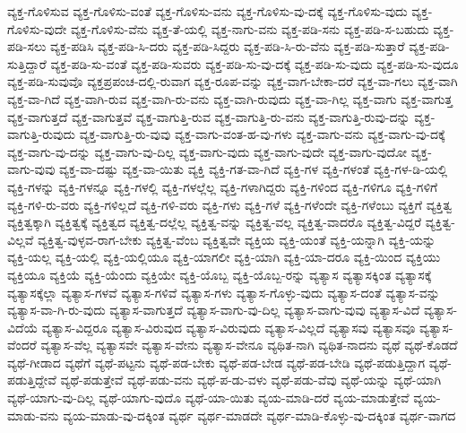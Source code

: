 {ವ್ಯಕ್ತ-ಗೊಳಿಸುವ
ವ್ಯಕ್ತ-ಗೊಳಿಸು-ವಂತೆ
ವ್ಯಕ್ತ-ಗೊಳಿಸು-ವನು
ವ್ಯಕ್ತ-ಗೊಳಿಸು-ವು-ದಕ್ಕೆ
ವ್ಯಕ್ತ-ಗೊಳಿಸು-ವುದು
ವ್ಯಕ್ತ-ಗೊಳಿಸು-ವುದೇ
ವ್ಯಕ್ತ-ಗೊಳಿಸು-ವೆನು
ವ್ಯಕ್ತ-ತೆ-ಯಲ್ಲಿ
ವ್ಯಕ್ತ-ನಾಗು-ವನು
ವ್ಯಕ್ತ-ಪಡಿ-ಸನು
ವ್ಯಕ್ತ-ಪಡಿ-ಸ-ಬಹುದು
ವ್ಯಕ್ತ-ಪಡಿ-ಸಲು
ವ್ಯಕ್ತ-ಪಡಿಸಿ
ವ್ಯಕ್ತ-ಪಡಿ-ಸಿ-ದರು
ವ್ಯಕ್ತ-ಪಡಿ-ಸಿದ್ದರು
ವ್ಯಕ್ತ-ಪಡಿ-ಸಿ-ರು-ವೆನು
ವ್ಯಕ್ತ-ಪಡಿ-ಸುತ್ತಾರೆ
ವ್ಯಕ್ತ-ಪಡಿ-ಸುತ್ತಿದ್ದಾರೆ
ವ್ಯಕ್ತ-ಪಡಿ-ಸು-ವಂತೆ
ವ್ಯಕ್ತ-ಪಡಿ-ಸುವರು
ವ್ಯಕ್ತ-ಪಡಿ-ಸು-ವು-ದಕ್ಕೆ
ವ್ಯಕ್ತ-ಪಡಿ-ಸು-ವುದು
ವ್ಯಕ್ತ-ಪಡಿ-ಸು-ವುದೂ
ವ್ಯಕ್ತ-ಪಡಿ-ಸುವುವೊ
ವ್ಯಕ್ತಪ್ರಪಂಚ-ದಲ್ಲಿ-ರುವಾಗ
ವ್ಯಕ್ತ-ರೂಪ-ವನ್ನು
ವ್ಯಕ್ತ-ವಾಗ-ಬೇಕಾ-ದರೆ
ವ್ಯಕ್ತ-ವಾ-ಗಲು
ವ್ಯಕ್ತ-ವಾಗಿ
ವ್ಯಕ್ತ-ವಾ-ಗಿದೆ
ವ್ಯಕ್ತ-ವಾಗಿ-ರುವ
ವ್ಯಕ್ತ-ವಾಗಿ-ರು-ವನು
ವ್ಯಕ್ತ-ವಾಗಿ-ರುವುದು
ವ್ಯಕ್ತ-ವಾ-ಗಿಲ್ಲ
ವ್ಯಕ್ತ-ವಾಗು
ವ್ಯಕ್ತ-ವಾಗುತ್ತ
ವ್ಯಕ್ತ-ವಾಗುತ್ತದೆ
ವ್ಯಕ್ತ-ವಾಗುತ್ತವೆ
ವ್ಯಕ್ತ-ವಾಗುತ್ತಿ-ರುವ
ವ್ಯಕ್ತ-ವಾಗುತ್ತಿ-ರು-ವನು
ವ್ಯಕ್ತ-ವಾಗುತ್ತಿ-ರುವು-ದನ್ನು
ವ್ಯಕ್ತ-ವಾಗುತ್ತಿ-ರುವುದು
ವ್ಯಕ್ತ-ವಾಗುತ್ತಿ-ರು-ವುವು
ವ್ಯಕ್ತ-ವಾಗು-ವಂತ-ಹ-ವು-ಗಳು
ವ್ಯಕ್ತ-ವಾಗು-ವನು
ವ್ಯಕ್ತ-ವಾಗು-ವು-ದಕ್ಕೆ
ವ್ಯಕ್ತ-ವಾಗು-ವು-ದನ್ನು
ವ್ಯಕ್ತ-ವಾಗು-ವು-ದಿಲ್ಲ
ವ್ಯಕ್ತ-ವಾಗು-ವುದು
ವ್ಯಕ್ತ-ವಾಗು-ವುದೇ
ವ್ಯಕ್ತ-ವಾಗು-ವುದೋ
ವ್ಯಕ್ತ-ವಾಗು-ವುವು
ವ್ಯಕ್ತ-ವಾ-ದಷ್ಟು
ವ್ಯಕ್ತ-ವಾ-ಯಿತು
ವ್ಯಕ್ತಿ
ವ್ಯಕ್ತಿ-ಗತ-ವಾ-ಗಿದೆ
ವ್ಯಕ್ತಿ-ಗಳ
ವ್ಯಕ್ತಿ-ಗಳಂತೆ
ವ್ಯಕ್ತಿ-ಗಳ-ಡಿ-ಯಲ್ಲಿ
ವ್ಯಕ್ತಿ-ಗಳನ್ನು
ವ್ಯಕ್ತಿ-ಗಳನ್ನೂ
ವ್ಯಕ್ತಿ-ಗಳಲ್ಲಿ
ವ್ಯಕ್ತಿ-ಗಳಲ್ಲೆಲ್ಲ
ವ್ಯಕ್ತಿ-ಗಳಾಗಿದ್ದರು
ವ್ಯಕ್ತಿ-ಗಳಿಂದ
ವ್ಯಕ್ತಿ-ಗಳಿಗೂ
ವ್ಯಕ್ತಿ-ಗಳಿಗೆ
ವ್ಯಕ್ತಿ-ಗಳಿ-ರು-ವರು
ವ್ಯಕ್ತಿ-ಗಳಿಲ್ಲದೆ
ವ್ಯಕ್ತಿ-ಗಳಿ-ವರು
ವ್ಯಕ್ತಿ-ಗಳು
ವ್ಯಕ್ತಿ-ಗಳೆ
ವ್ಯಕ್ತಿ-ಗಳೆಂದೇ
ವ್ಯಕ್ತಿ-ಗಳೆಂಬು
ವ್ಯಕ್ತಿಗೆ
ವ್ಯಕ್ತಿತ್ವ
ವ್ಯಕ್ತಿತ್ವಕ್ಕಾಗಿ
ವ್ಯಕ್ತಿತ್ವಕ್ಕೆ
ವ್ಯಕ್ತಿತ್ವದ
ವ್ಯಕ್ತಿತ್ವ-ದಲ್ಲೆಲ್ಲ
ವ್ಯಕ್ತಿತ್ವ-ವನ್ನು
ವ್ಯಕ್ತಿತ್ವ-ವಲ್ಲ
ವ್ಯಕ್ತಿತ್ವ-ವಾದರೊ
ವ್ಯಕ್ತಿತ್ವ-ವಿದ್ದರೆ
ವ್ಯಕ್ತಿತ್ವ-ವಿಲ್ಲವೆ
ವ್ಯಕ್ತಿತ್ವ-ವುಳ್ಳವ-ರಾಗ-ಬೇಕು
ವ್ಯಕ್ತಿತ್ವ-ವೆಂಬ
ವ್ಯಕ್ತಿತ್ವವೇ
ವ್ಯಕ್ತಿಯ
ವ್ಯಕ್ತಿ-ಯಂತೆ
ವ್ಯಕ್ತಿ-ಯನ್ನಾಗಿ
ವ್ಯಕ್ತಿ-ಯನ್ನು
ವ್ಯಕ್ತಿ-ಯಲ್ಲ
ವ್ಯಕ್ತಿ-ಯಲ್ಲಿ
ವ್ಯಕ್ತಿ-ಯಲ್ಲಿಯೂ
ವ್ಯಕ್ತಿ-ಯಾಗಲೀ
ವ್ಯಕ್ತಿ-ಯಾಗಿ
ವ್ಯಕ್ತಿ-ಯಾ-ದರೂ
ವ್ಯಕ್ತಿ-ಯಿಂದ
ವ್ಯಕ್ತಿಯು
ವ್ಯಕ್ತಿಯೂ
ವ್ಯಕ್ತಿಯೆ
ವ್ಯಕ್ತಿ-ಯೆಂದು
ವ್ಯಕ್ತಿಯೇ
ವ್ಯಕ್ತಿ-ಯೊಬ್ಬ
ವ್ಯಕ್ತಿ-ಯೊಬ್ಬ-ರನ್ನು
ವ್ಯತ್ಯಾಸ
ವ್ಯತ್ಯಾಸಕ್ಕಿಂತ
ವ್ಯತ್ಯಾಸಕ್ಕೆ
ವ್ಯತ್ಯಾಸಕ್ಕೆಲ್ಲಾ
ವ್ಯತ್ಯಾಸ-ಗಳವೆ
ವ್ಯತ್ಯಾಸ-ಗಳಿವೆ
ವ್ಯತ್ಯಾಸ-ಗಳು
ವ್ಯತ್ಯಾಸ-ಗೊಳ್ಳು-ವುದು
ವ್ಯತ್ಯಾಸ-ದಂತೆ
ವ್ಯತ್ಯಾಸ-ವನ್ನು
ವ್ಯತ್ಯಾಸ-ವಾ-ಗಿ-ರು-ವುದು
ವ್ಯತ್ಯಾಸ-ವಾಗುತ್ತದೆ
ವ್ಯತ್ಯಾಸ-ವಾಗು-ವು-ದಿಲ್ಲ
ವ್ಯತ್ಯಾಸ-ವಾಗು-ವುವು
ವ್ಯತ್ಯಾಸ-ವಿದೆ
ವ್ಯತ್ಯಾಸ-ವಿದೆಯೆ
ವ್ಯತ್ಯಾಸ-ವಿದ್ದರೂ
ವ್ಯತ್ಯಾಸ-ವಿರುವುದ
ವ್ಯತ್ಯಾಸ-ವಿರುವುದು
ವ್ಯತ್ಯಾಸ-ವಿಲ್ಲದೆ
ವ್ಯತ್ಯಾಸವು
ವ್ಯತ್ಯಾಸವೂ
ವ್ಯತ್ಯಾಸ-ವೆಂದರೆ
ವ್ಯತ್ಯಾಸ-ವೆಲ್ಲ
ವ್ಯತ್ಯಾಸವೇ
ವ್ಯತ್ಯಾಸ-ವೇನು
ವ್ಯತ್ಯಾಸ-ವೇನೂ
ವ್ಯಥಿತ-ನಾಗಿ
ವ್ಯಥಿತ-ನಾದನು
ವ್ಯಥೆ
ವ್ಯಥೆ-ಕೊಡದೆ
ವ್ಯಥೆ-ಗೀಡಾದ
ವ್ಯಥೆಗೆ
ವ್ಯಥೆ-ಪಟ್ಟನು
ವ್ಯಥೆ-ಪಡ-ಬೇಕು
ವ್ಯಥೆ-ಪಡ-ಬೇಡ
ವ್ಯಥೆ-ಪಡ-ಬೇಡಿ
ವ್ಯಥೆ-ಪಡುತ್ತಿದ್ದಾಗ
ವ್ಯಥೆ-ಪಡುತ್ತಿದ್ದೇವೆ
ವ್ಯಥೆ-ಪಡುತ್ತೇವೆ
ವ್ಯಥೆ-ಪಡು-ವನು
ವ್ಯಥೆ-ಪ-ಡು-ವಳು
ವ್ಯಥೆ-ಪಡು-ವೆವು
ವ್ಯಥೆ-ಯನ್ನು
ವ್ಯಥೆ-ಯಾಗಿ
ವ್ಯಥೆ-ಯಾಗು-ವು-ದಿಲ್ಲ
ವ್ಯಥೆ-ಯಾಗು-ವುದೊ
ವ್ಯಥೆ-ಯಾ-ಯಿತು
ವ್ಯಯ-ಮಾಡಿ-ದರೆ
ವ್ಯಯ-ಮಾಡುತ್ತೇವೆ
ವ್ಯಯ-ಮಾಡು-ವನು
ವ್ಯಯ-ಮಾಡು-ವು-ದಕ್ಕಿಂತ
ವ್ಯರ್ಥ
ವ್ಯರ್ಥ-ಮಾಡದೇ
ವ್ಯರ್ಥ-ಮಾಡಿ-ಕೊಳ್ಳು-ವು-ದಕ್ಕಿಂತ
ವ್ಯರ್ಥ-ವಾಗದ
}
